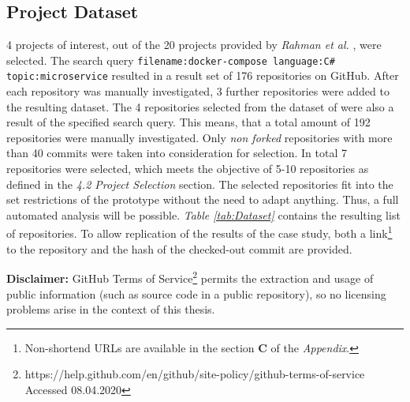 \documentclass{article}
\begin{document}
\subsection{Project Dataset}
4 projects of interest, out of the 20 projects provided by \textit{Rahman et al.} \cite{imranur_curated_2019}, were selected. 
The search query 
\lstinline{filename:docker-compose language:C# topic:microservice}
resulted in a result set of 176 repositories on GitHub. After each repository was manually investigated, 3 further  repositories were added to the resulting dataset. The 4 repositories selected from the dataset of \cite{imranur_curated_2019} were also a result of the specified search query. 
This means, that a total amount of 192 repositories were manually investigated. Only \textit{non forked} repositories with more than 40 commits were taken into consideration for selection. In total 7 repositories were selected, which meets the objective of 5-10 repositories as defined in the \textit{4.2 Project Selection} section. The selected repositories fit into the set restrictions of the prototype without the need to adapt anything. Thus, a full automated analysis will be possible.
\textit{Table \ref{tab:Dataset}} contains the resulting list of repositories. To allow replication of the results of the case study, both a link\footnote{Non-shortend URLs are available in the section \textbf{C} of the \textit{Appendix}.} to the repository and the hash of the checked-out commit are provided. \newline

\noindent\textbf{Disclaimer: } GitHub Terms of Service\footnote{https://help.github.com/en/github/site-policy/github-terms-of-service Accessed 08.04.2020} permits the extraction and usage of public information (such as source code in a public repository), so no licensing problems arise in the context of this thesis.
\end{document}
